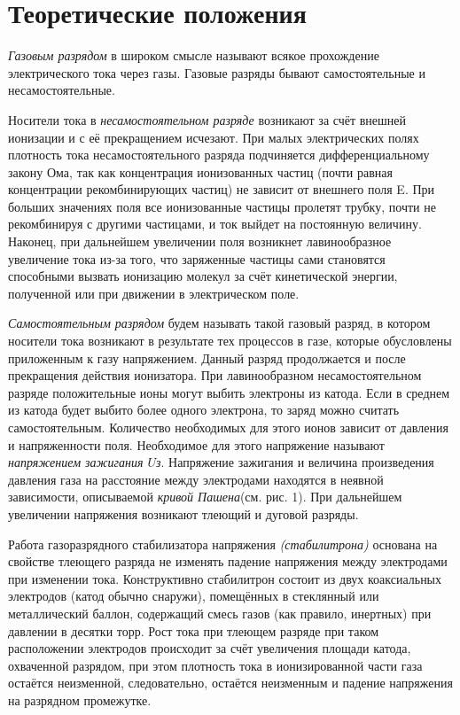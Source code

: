 \documentclass[a4paper]{article}
\begin{document}
\section{Теоретические положения}

\textit{Газовым разрядом} в широком смысле называют всякое прохождение электрического тока
через газы. Газовые разряды бывают самостоятельные и несамостоятельные. \par 
Носители тока в \textit{несамостоятельном разряде} возникают за счёт внешней ионизации и с её
прекращением исчезают. При малых электрических полях плотность тока несамостоятельного разряда подчиняется дифференциальному закону Ома, так как концентрация ионизованных частиц (почти равная концентрации рекомбинирующих частиц) не зависит от внешнего поля E. При больших значениях поля все ионизованные частицы пролетят трубку, почти
не рекомбинируя с другими частицами, и ток выйдет на постоянную величину. Наконец,
при дальнейшем увеличении поля возникнет лавинообразное увеличение тока из-за того,
что заряженные частицы сами становятся способными вызвать ионизацию молекул за счёт
кинетической энергии, полученной или при движении в электрическом поле. \par
\textit{Самостоятельным разрядом} будем называть такой газовый разряд, в котором носители
тока возникают в результате тех процессов в газе, которые обусловлены приложенным к газу напряжением. Данный разряд продолжается и после прекращения действия ионизатора.
При лавинообразном несамостоятельном разряде положительные ионы могут выбить электроны из катода. Если в среднем из катода будет выбито более одного электрона, то заряд
можно считать самостоятельным. Количество необходимых для этого ионов зависит от давления и напряженности поля. Необходимое для этого напряжение называют \textit{напряжением
зажигания $U$з}. Напряжение зажигания и величина произведения давления газа на расстояние между электродами находятся в неявной зависимости, описываемой \textit{кривой Пашена}(см. рис. 1). При дальнейшем увеличении напряжения возникают тлеющий и дуговой разряды. \par

Работа газоразрядного стабилизатора напряжения  \textit{(стабилитрона)} основана на свойстве тлеющего разряда не изменять падение напряжения между электродами при изменении тока. Конструктивно стабилитрон состоит из двух коаксиальных электродов (катод обычно снаружи), помещённых в стеклянный или металлический баллон, содержащий смесь газов (как правило, инертных) при давлении в десятки торр. Рост тока при тлеющем разряде при таком расположении электродов происходит за счёт увеличения площади катода, охваченной разрядом, при этом плотность тока в ионизированной части газа остаётся неизменной, следовательно, остаётся неизменным и падение напряжения на разрядном промежутке. 
\end{document}
